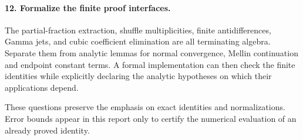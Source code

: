 \paragraph{12. Formalize the finite proof interfaces.}
The partial-fraction extraction, shuffle multiplicities, finite
antidifferences, Gamma jets, and cubic coefficient elimination are
all terminating algebra. Separate them from analytic lemmas for
normal convergence, Mellin continuation and endpoint constant
terms. A formal implementation can then check the finite identities
while explicitly declaring the analytic hypotheses on which their
applications depend.

These questions preserve the emphasis on exact identities and
normalizations. Error bounds appear in this report only to certify
the numerical evaluation of an already proved identity.
